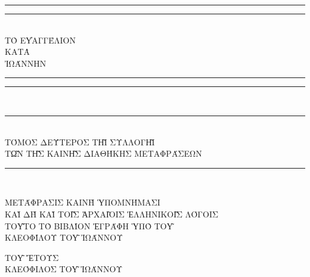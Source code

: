 \begin{doubletitle}
    \textheight
    \centering
    \vspace*{\baselineskip}
    \rule{\textwidth}{1.6pt}\vspace*{-\baselineskip}\vspace*{2pt}
    \rule{\textwidth}{0.4pt}\\[\baselineskip]
    {\uppercase{\LARGE Τὸ εὐαγγέλιον \\ κατὰ \\[0.3\baselineskip] Ἰωάννην }}\\[0.2\baselineskip]
    \rule{\textwidth}{0.4pt}\vspace*{-\baselineskip}\vspace{3.2pt}
    \rule{\textwidth}{1.6pt}\\
    
    \scshape
    \rule{\textwidth}{0.4pt}\\[\baselineskip]
    {\Large\uppercase{Τόμος δεύτερος τῇ συλλογῇ \\ τῶν τῆς Καινῆς Διαθήκης μεταφράσεων } }\\[0.2\baselineskip]
    \rule{\textwidth}{0.4pt}\vspace*{-\baselineskip}\vspace{3.2pt}\\[\baselineskip]\vspace*{2\baselineskip}
    
    \uppercase{Μετάφρασις καινὴ ὑπομνήμασι \\
    καὶ δὴ καὶ τοῖς ἀρχαῖοις Ἑλληνικοῖς λόγοις} \\ 
    \vspace*{2\baselineskip}  
    \uppercase{Τοῦτο τὸ βιβλίον ἐγράφη ὑπὸ τοῦ \\[\baselineskip]
    {\Large Κλεοφίλου τοῦ Ἰωάννου}}\par
    \vfill
    {\scshape \uppercase{\greekdate{\the\month} τοῦ} \Greeknumeral{\the\year}} \uppercase{ἔτους}  \\
    {\large \uppercase{Κλεόφιλος τοῦ Ἰωάννου}}\par
\end{doubletitle}